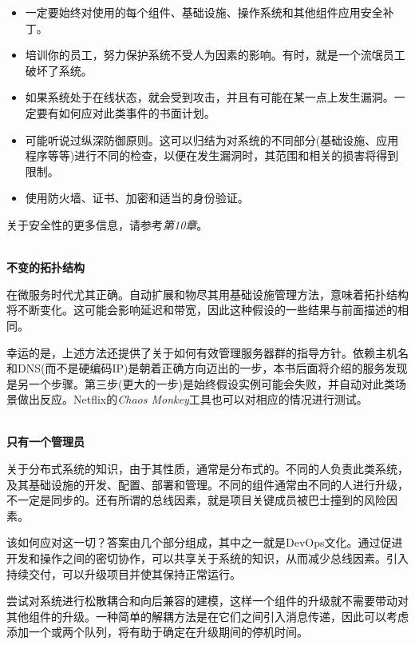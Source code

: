 \begin{itemize}
\item 
一定要始终对使用的每个组件、基础设施、操作系统和其他组件应用安全补丁。

\item 
培训你的员工，努力保护系统不受人为因素的影响。有时，就是一个流氓员工破坏了系统。

\item 
如果系统处于在线状态，就会受到攻击，并且有可能在某一点上发生漏洞。一定要有如何应对此类事件的书面计划。

\item 
可能听说过纵深防御原则。这可以归结为对系统的不同部分(基础设施、应用程序等等)进行不同的检查，以便在发生漏洞时，其范围和相关的损害将得到限制。

\item 
使用防火墙、证书、加密和适当的身份验证。
\end{itemize}

关于安全性的更多信息，请参考\textit{第10章}。

\hspace*{\fill} \\ %
\noindent
\textbf{不变的拓扑结构}

在微服务时代尤其正确。自动扩展和物尽其用基础设施管理方法，意味着拓扑结构将不断变化。这可能会影响延迟和带宽，因此这种假设的一些结果与前面描述的相同。

幸运的是，上述方法还提供了关于如何有效管理服务器群的指导方针。依赖主机名和DNS(而不是硬编码IP)是朝着正确方向迈出的一步，本书后面将介绍的服务发现是另一个步骤。第三步(更大的一步)是始终假设实例可能会失败，并自动对此类场景做出反应。Netflix的\textit{Chaos Monkey}工具也可以对相应的情况进行测试。

\hspace*{\fill} \\ %
\noindent
\textbf{只有一个管理员}

关于分布式系统的知识，由于其性质，通常是分布式的。不同的人负责此类系统，及其基础设施的开发、配置、部署和管理。不同的组件通常由不同的人进行升级，不一定是同步的。还有所谓的总线因素，就是项目关键成员被巴士撞到的风险因素。

该如何应对这一切？答案由几个部分组成，其中之一就是DevOps文化。通过促进开发和操作之间的密切协作，可以共享关于系统的知识，从而减少总线因素。引入持续交付，可以升级项目并使其保持正常运行。

尝试对系统进行松散耦合和向后兼容的建模，这样一个组件的升级就不需要带动对其他组件的升级。一种简单的解耦方法是在它们之间引入消息传递，因此可以考虑添加一个或两个队列，将有助于确定在升级期间的停机时间。

